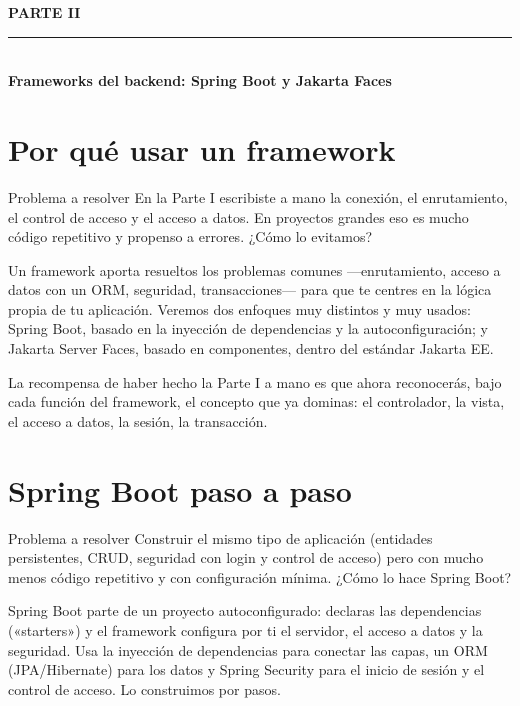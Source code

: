 \documentclass[11pt]{article}
\begin{document}
\clearpage
\thispagestyle{empty}
\vspace*{5cm}\begin{center}
{\color{jweboro}\bfseries\Large PARTE II}\\[10pt]
{\color{jwebazul}\rule{0.5\linewidth}{1.5pt}}\\[14pt]
{\color{tinta}\bfseries\fontsize{26}{30}\selectfont Frameworks del backend: Spring Boot y Jakarta Faces}
\end{center}\clearpage
\section{Por qué usar un framework}
\begin{cajaproblema}{Problema a resolver}
En la Parte I escribiste a mano la conexión, el enrutamiento, el control de acceso y el acceso a datos. En proyectos grandes eso es mucho código repetitivo y propenso a errores. ¿Cómo lo evitamos?\par
\end{cajaproblema}
Un framework aporta resueltos los problemas comunes —enrutamiento, acceso a datos con un ORM, seguridad, transacciones— para que te centres en la lógica propia de tu aplicación. Veremos dos enfoques muy distintos y muy usados: Spring Boot, basado en la inyección de dependencias y la autoconfiguración; y Jakarta Server Faces, basado en componentes, dentro del estándar Jakarta EE.

La recompensa de haber hecho la Parte I a mano es que ahora reconocerás, bajo cada función del framework, el concepto que ya dominas: el controlador, la vista, el acceso a datos, la sesión, la transacción.

\section{Spring Boot paso a paso}
\begin{cajaproblema}{Problema a resolver}
Construir el mismo tipo de aplicación (entidades persistentes, CRUD, seguridad con login y control de acceso) pero con mucho menos código repetitivo y con configuración mínima. ¿Cómo lo hace Spring Boot?\par
\end{cajaproblema}
Spring Boot parte de un proyecto autoconfigurado: declaras las dependencias («starters») y el framework configura por ti el servidor, el acceso a datos y la seguridad. Usa la inyección de dependencias para conectar las capas, un ORM (JPA/Hibernate) para los datos y Spring Security para el inicio de sesión y el control de acceso. Lo construimos por pasos.
\end{document}
